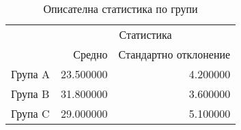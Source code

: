 \begin{table}
\caption{Описателна статистика по групи}
\label{tab:multiindex_stats}
\begin{tabular}{lrr}
\toprule
 & \multicolumn{2}{c}{Статистика} \\
 & Средно & Стандартно отклонение \\
\midrule
Група A & 23.500000 & 4.200000 \\
Група B & 31.800000 & 3.600000 \\
Група C & 29.000000 & 5.100000 \\
\bottomrule
\end{tabular}
\end{table}
